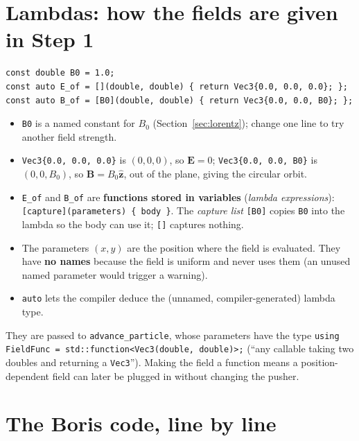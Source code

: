 \documentclass[11pt,a4paper]{article}
\newcommand{\EE}{\mathbf{E}}
\newcommand{\BB}{\mathbf{B}}
\begin{document}
\section{Lambdas: how the fields are given in Step 1}

\begin{lstlisting}
const double B0 = 1.0;
const auto E_of = [](double, double) { return Vec3{0.0, 0.0, 0.0}; };
const auto B_of = [B0](double, double) { return Vec3{0.0, 0.0, B0}; };
\end{lstlisting}
\begin{itemize}
  \item \texttt{B0} is a named constant for $B_0$ (Section~\ref{sec:lorentz}); change one line to try another
        field strength.
  \item \lstinline|Vec3{0.0, 0.0, 0.0}| is $(0,0,0)$, so $\EE=0$; \lstinline|Vec3{0.0, 0.0, B0}| is
        $(0,0,B_0)$, so $\BB=B_0\hat{\mathbf z}$, out of the plane, giving the circular orbit.
  \item \texttt{E\_of} and \texttt{B\_of} are \textbf{functions stored in variables} (\emph{lambda expressions}):
        \lstinline|[capture](parameters) { body }|. The \emph{capture list} \lstinline|[B0]| copies
        \texttt{B0} into the lambda so the body can use it; \lstinline|[]| captures nothing.
  \item The parameters $(x,y)$ are the position where the field is evaluated. They have \textbf{no names}
        because the field is uniform and never uses them (an unused named parameter would trigger a warning).
  \item \texttt{auto} lets the compiler deduce the (unnamed, compiler-generated) lambda type.
\end{itemize}
They are passed to \texttt{advance\_particle}, whose parameters have the type
\lstinline|using FieldFunc = std::function<Vec3(double, double)>;| (``any callable taking two doubles and
returning a \texttt{Vec3}''). Making the field a function means a position-dependent field can later be
plugged in without changing the pusher.

\section{The Boris code, line by line}
\end{document}

